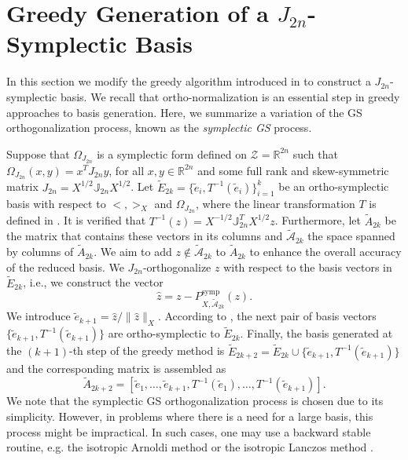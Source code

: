 \section{Greedy Generation of a $J_{2n}$-Symplectic Basis} \label{sec:normmor.2}
In this section we modify the greedy algorithm introduced in  to construct a $J_{2n}$-symplectic basis. We recall that ortho-normalization is an essential step in greedy approaches to basis generation. Here, we summarize a variation of the GS orthogonalization process, known as the \emph{symplectic GS} process.

Suppose that $\Omega_{J_{2n}}$ is a symplectic form defined on $\mathcal Z =\mathbb R^{2n}$ such that $\Omega_{J_{2n}}(x,y) = x^T J_{2n} y$, for all $x,y\in \mathbb R^{2n}$ and some full rank and skew-symmetric matrix $J_{2n} = X^{1/2} \mathbb J_{2n} X^{1/2}$. Let $\tilde E_{2k} = \{ \tilde e_i , T^{-1}(\tilde e_i) \}_{i=1}^k$ be an ortho-symplectic basis with respect to $<,>_X$ and $\Omega_{J_{2n}}$, where the linear transformation $T$ is defined in . It is verified that $T^{-1}(z) = X^{-1/2}\mathbb J^T_{2n}X^{1/2}z$. Furthermore, let $\tilde A_{2k}$ be the matrix that contains these vectors in its columns and $\tilde {\mathcal A}_{2k}$ the space spanned by columns of $\tilde A_{2k}$. We aim to add $z\not \in \tilde{\mathcal A}_{2k}$ to $\tilde A_{2k}$ to enhance the overall accuracy of the reduced basis. We $J_{2n}$-orthogonalize $z$ with respect to the basis vectors in $\tilde E_{2k}$, i.e., we construct the vector 
\begin{equation} \label{eq:normmor.9}
	\hat z = z - P^{\text{symp}}_{X,\tilde{\mathcal A}_{2k}}(z).
\end{equation}
We introduce $\tilde e_{k+1} = \hat z / \| \hat z \|_X$. According to , the next pair of basis vectors $\{ \tilde e_{k+1} , T^{-1}( \tilde e_{k+1})\}$ are ortho-symplectic to $\tilde E_{2k}$. Finally, the basis generated at the $(k+1)$-th step of the greedy method is $\tilde E_{2k+2} = \tilde E_{2k}\cup\{ \tilde e_{k+1} , T^{-1}(\tilde e_{k+1})\}$ and the corresponding matrix is assembled as
\begin{equation} \label{eq:normmor.11}
	\tilde A_{2k+2} = [\tilde e_1,\dots,\tilde e_{k+1},T^{-1}(\tilde e_1),\dots,T^{-1}(\tilde e_{k+1})].
\end{equation}
We note that the symplectic GS orthogonalization process is chosen due to its simplicity. However, in problems where there is a need for a large basis, this process might be impractical. In such cases, one may use a backward stable routine, e.g. the isotropic Arnoldi method or the isotropic Lanczos method \cite{doi:10.1137/S1064827500366434}.

